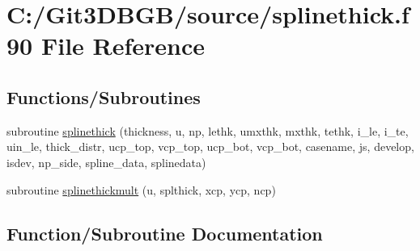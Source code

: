 \hypertarget{splinethick_8f90}{}\section{C\+:/\+Git3\+D\+B\+G\+B/source/splinethick.f90 File Reference}
\label{splinethick_8f90}
\subsection*{Functions/\+Subroutines}
\begin{DoxyCompactItemize}
\item 
subroutine \hyperlink{splinethick_8f90_a33ce5218842ab375847d280e88cf257b}{splinethick} (thickness, u, np, lethk, umxthk, mxthk, tethk,                                                                                       i\+\_\+le, i\+\_\+te, uin\+\_\+le, thick\+\_\+distr, ucp\+\_\+top, vcp\+\_\+top, ucp\+\_\+bot, vcp\+\_\+bot, casename, js, develop, isdev, np\+\_\+side, spline\+\_\+data, splinedata)
\item 
subroutine \hyperlink{splinethick_8f90_af049d9f2138cbb8bee82a58fec39a29e}{splinethickmult} (u, splthick, xcp, ycp, ncp)
\end{DoxyCompactItemize}


\subsection{Function/\+Subroutine Documentation}
\hypertarget{splinethick_8f90_a33ce5218842ab375847d280e88cf257b}{}
